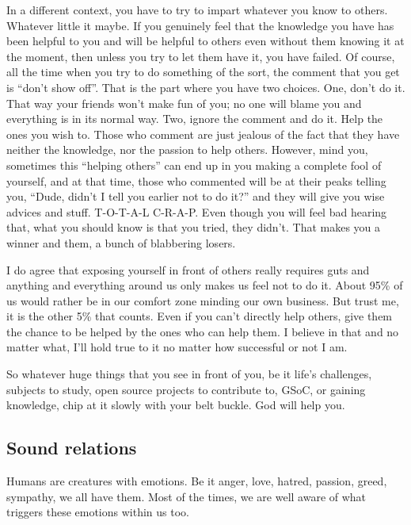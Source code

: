 \documentclass[twoside,11pt,titlepage]{article}
\begin{document}
In a different context, you have to try to impart whatever you know to others. Whatever little it maybe. If you genuinely feel that the knowledge you have has been helpful to you and will be helpful to others even without them knowing it at the moment, then unless you try to let them have it, you have failed. Of course, all the time when you try to do something of the sort, the comment that you get is ``don't show off''. That is the part where you have two choices. One, don't do it. That way your friends won't make fun of you; no one will blame you and everything is in its normal way. Two, ignore the comment and do it. Help the ones you wish to. Those who comment are just jealous of the fact that they have neither the knowledge, nor the passion to help others. However, mind you, sometimes this ``helping others'' can end up in you making a complete fool of yourself, and at that time, those who commented will be at their peaks telling you, ``Dude, didn't I tell you earlier not to do it?'' and they will give you wise advices and stuff. T-O-T-A-L C-R-A-P. Even though you will feel bad hearing that, what you should know is that you tried, they didn't. That makes you a winner and them, a bunch of blabbering losers.

I do agree that exposing yourself in front of others really requires guts and anything and everything around us only makes us feel not to do it. About 95\% of us would rather be in our comfort zone minding our own business. But trust me, it is the other 5\% that counts. Even if you can't directly help others, give them the chance to be helped by the ones who can help them. I believe in that and no matter what, I'll hold true to it no matter how successful or not I am.

So whatever huge things that you see in front of you, be it life's challenges, subjects to study, open source projects to contribute to, GSoC, or gaining knowledge, chip at it slowly with your belt buckle. God will help you.

\newpage
\begin{center}
  \section{Sound relations}
\end{center}
\bigskip
\bigskip
\bigskip

Humans are creatures with emotions. Be it anger, love, hatred, passion, greed, sympathy, we all have them. Most of the times, we are well aware of what triggers these emotions within us too.
\end{document}
